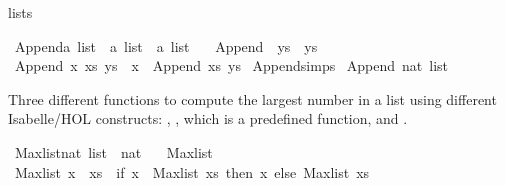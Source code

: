 \begin{isabellebody}
\begin{isamarkuptext}
      lists%
\end{isamarkuptext}\isamarkuptrue%
\isamarkupfalse%
\ Append{\isacharcolon}{\kern0pt}{\isacharcolon}{\kern0pt}{\isachardoublequoteopen}{\isacharprime}{\kern0pt}a\ list\ {\isasymRightarrow}\ {\isacharprime}{\kern0pt}a\ list\ {\isasymRightarrow}\ {\isacharprime}{\kern0pt}a\ list{\isachardoublequoteclose}\ \isanewline
\ \ {\isachardoublequoteopen}Append\ {\isacharbrackleft}{\kern0pt}{\isacharbrackright}{\kern0pt}\ ys\ {\isacharequal}{\kern0pt}\ ys{\isachardoublequoteclose}\isanewline
{\isacharbar}{\kern0pt}\ {\isachardoublequoteopen}Append\ {\isacharparenleft}{\kern0pt}x\ {\isacharhash}{\kern0pt}xs{\isacharparenright}{\kern0pt}\ ys\ {\isacharequal}{\kern0pt}\ x\ {\isacharhash}{\kern0pt}\ {\isacharparenleft}{\kern0pt}Append\ xs\ ys{\isacharparenright}{\kern0pt}{\isachardoublequoteclose}\isanewline
\isanewline
{}\isamarkupfalse%
\ Append{\isachardot}{\kern0pt}simps\isanewline
\isanewline
{}\isamarkupfalse%
\ {\isachardoublequoteopen}Append\ {\isacharparenleft}{\kern0pt}{\isacharbrackleft}{\kern0pt}{}{\isacharcomma}{\kern0pt}{}{\isacharbrackright}{\kern0pt}{\isacharcolon}{\kern0pt}{\isacharcolon}{\kern0pt}nat\ list{\isacharparenright}{\kern0pt}\ {\isacharbrackleft}{\kern0pt}{}{\isacharcomma}{\kern0pt}{}{\isacharbrackright}{\kern0pt}{\isachardoublequoteclose}%
\begin{isamarkuptext}%
Three different functions to compute the largest number in a list using different Isabelle/HOL
      constructs: , , which is a predefined function, and .%
\end{isamarkuptext}\isamarkuptrue%
\isamarkupfalse%
\ Max{\isacharunderscore}{\kern0pt}list{\isacharcolon}{\kern0pt}{\isacharcolon}{\kern0pt}{\isachardoublequoteopen}nat\ list\ {\isasymRightarrow}\ nat{\isachardoublequoteclose}\ \isanewline
\ \ {\isachardoublequoteopen}Max{\isacharunderscore}{\kern0pt}list\ {\isacharbrackleft}{\kern0pt}{\isacharbrackright}{\kern0pt}\ {\isacharequal}{\kern0pt}\ {}{\isachardoublequoteclose}\isanewline
{\isacharbar}{\kern0pt}\ {\isachardoublequoteopen}Max{\isacharunderscore}{\kern0pt}list\ {\isacharparenleft}{\kern0pt}x\ {\isacharhash}{\kern0pt}\ xs{\isacharparenright}{\kern0pt}\ {\isacharequal}{\kern0pt}\ {\isacharparenleft}{\kern0pt}if\ {\isacharparenleft}{\kern0pt}x\ {\isasymge}\ Max{\isacharunderscore}{\kern0pt}list\ xs{\isacharparenright}{\kern0pt}\ then\ x\ else\ {\isacharparenleft}{\kern0pt}Max{\isacharunderscore}{\kern0pt}list\ xs{\isacharparenright}{\kern0pt}{\isacharparenright}{\kern0pt}{\isachardoublequoteclose}\isanewline

\end{isabellebody}

